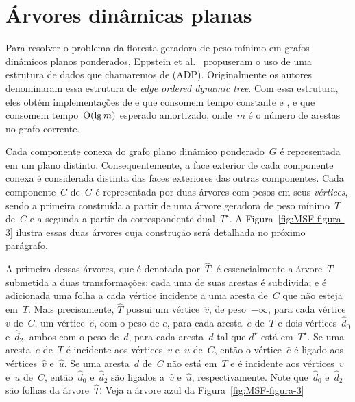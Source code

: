 \section{Árvores dinâmicas planas}
\label{sec:MSFcomADP}

Para resolver o problema da floresta geradora de peso mínimo em grafos dinâmicos planos ponderados, Eppstein et al.~\cite{EPPSTEIN-planar} propuseram o uso de uma estrutura de dados que chamaremos de  (ADP). Originalmente os autores denominaram essa estrutura de \textit{edge ordered dynamic tree}.
Com essa estrutura, eles obtém implementações de \MSFCreate{} e \MSFweight{} que consomem tempo constante e \MSFaddEdge{}, \MSFdelEdge{} e \MSFupdate{} que consomem tempo~$\mathrm{O}(\lg m)$ esperado amortizado, onde~$m$ é o número de arestas no grafo corrente. 



Cada componente conexa do grafo plano dinâmico ponderado~$G$ é representada em um plano distinto.
Consequentemente, a face exterior de cada componente conexa é considerada distinta das faces exteriores das outras componentes.
Cada componente~$C$ de~$G$ é representada por duas árvores com pesos em seus \textit{vértices}, sendo a primeira construída a partir de uma árvore geradora de peso mínimo~$T$ de~$C$ e a segunda a partir da correspondente dual~$T^\star$.
A Figura~\ref{fig:MSF-figura-3} ilustra essas duas árvores cuja construção será detalhada no próximo parágrafo.

A primeira dessas árvores, que é denotada por~$\hat T$, é essencialmente a árvore~$T$ submetida a duas transformações:
cada uma de suas arestas é subdivida; e é adicionada uma folha a cada vértice incidente a uma aresta de~$C$ que não esteja em~$T$.
Mais precisamente, $\hat T$ possui um vértice~$\hat v$, de peso~$-\infty$, para cada vértice~$v$ de~$C$, um vértice~$\hat e$, com o peso de $e$, para cada aresta~$e$ de~$T$ e dois vértices~$\hat d_0$ e~$\hat d_2$, ambos com o peso de~$d$, para cada aresta~$d$ tal que $d^\star$ está em~$T^\star$.
Se uma aresta~$e$ de~$T$ é incidente aos vértices~$v$ e~$u$ de~$C$, então o vértice~$\hat e$ é ligado aos vértices~$\hat v$ e~$\hat u$.
Se uma aresta~$d$ de~$C$ não está em~$T$ e é incidente aos vértices~$v$ e~$u$ de~$C$, então~$\hat d_0$ e~$\hat d_2$ são ligados a~$\hat v$ e~$\hat u$, respectivamente.
Note que~$\hat d_0$ e~$\hat d_2$ são folhas da árvore~$\hat T$.
Veja a árvore azul da Figura~\ref{fig:MSF-figura-3} 

